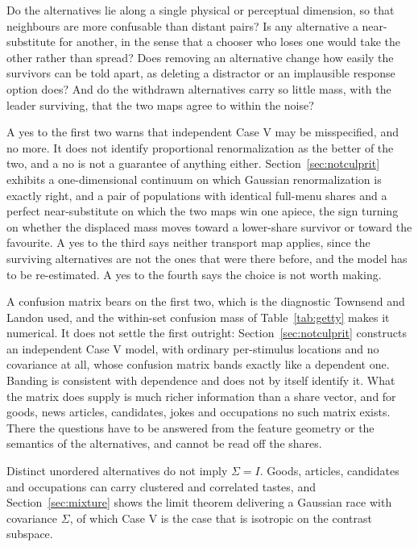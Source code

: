 \documentclass[11pt]{article}
\begin{document}
Do the alternatives lie along a single physical or perceptual dimension, so that neighbours
are more confusable than distant pairs? Is any alternative a near-substitute for another,
in the sense that a chooser who loses one would take the other rather than spread? Does
removing an alternative change how easily the survivors can be told apart, as deleting a
distractor or an implausible response option does? And do the withdrawn alternatives carry so little mass,
with the leader surviving, that the two maps agree to within the noise?

A yes to the first two warns that independent Case V may be misspecified, and no more. It does
not identify proportional renormalization as the better of the two, and a no is not a guarantee
of anything either.
Section~\ref{sec:notculprit} exhibits a one-dimensional continuum on which Gaussian
renormalization is exactly right, and a pair of populations with identical full-menu shares and a
perfect near-substitute on which the two maps win one apiece, the sign turning on whether the
displaced mass moves toward a lower-share survivor or toward the favourite. A yes to the third
says neither transport map applies, since the surviving alternatives are not the ones that were
there before, and the model has to be re-estimated. A yes to the fourth says the choice is not
worth making.

A confusion matrix bears on the first two, which is the diagnostic Townsend and Landon
\cite{townsendlandon1982} used, and the within-set confusion mass of Table~\ref{tab:getty}
makes it numerical. It does not settle the first outright: Section~\ref{sec:notculprit}
constructs an independent Case V model, with ordinary per-stimulus locations and no covariance
at all, whose confusion matrix bands exactly like a dependent one. Banding is consistent with
dependence and does not by itself identify it. What the matrix does supply is much richer
information than a share vector, and for goods, news articles, candidates, jokes and occupations
no such matrix exists. There the
questions have to be answered from the feature geometry or the semantics of the alternatives,
and cannot be read off the shares.

Distinct unordered alternatives do not imply $\Sigma = I$. Goods, articles, candidates and occupations can carry clustered and
correlated tastes, and Section~\ref{sec:mixture} shows the limit theorem delivering a Gaussian
race with covariance $\Sigma$, of which Case V is the case that is isotropic on the contrast
subspace.
\end{document}
